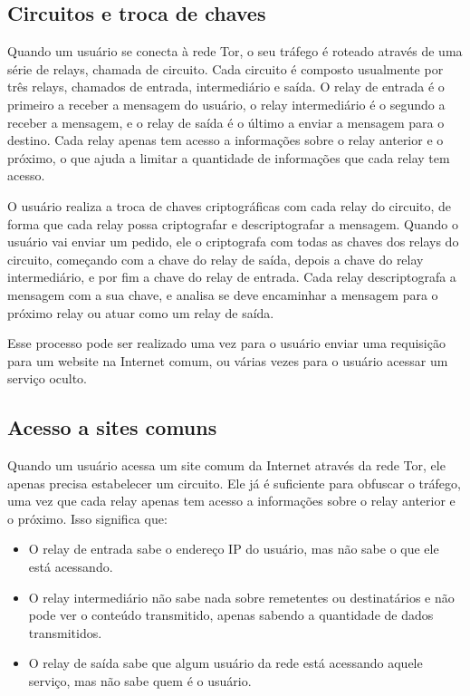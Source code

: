 \subsection{Circuitos e troca de chaves}

Quando um usuário se conecta à rede Tor, o seu tráfego é roteado através de uma série de relays, chamada de circuito. Cada circuito é composto usualmente por três relays, chamados de entrada, intermediário e saída. O relay de entrada é o primeiro a receber a mensagem do usuário, o relay intermediário é o segundo a receber a mensagem, e o relay de saída é o último a enviar a mensagem para o destino. Cada relay apenas tem acesso a informações sobre o relay anterior e o próximo, o que ajuda a limitar a quantidade de informações que cada relay tem acesso.

O usuário realiza a troca de chaves criptográficas com cada relay do circuito, de forma que cada relay possa criptografar e descriptografar a mensagem. Quando o usuário vai enviar um pedido, ele o criptografa com todas as chaves dos relays do circuito, começando com a chave do relay de saída, depois a chave do relay intermediário, e por fim a chave do relay de entrada. Cada relay descriptografa a mensagem com a sua chave, e analisa se deve encaminhar a mensagem para o próximo relay ou atuar como um relay de saída.

Esse processo pode ser realizado uma vez para o usuário enviar uma requisição para um website na Internet comum, ou várias vezes para o usuário acessar um serviço oculto.

\subsection{Acesso a sites comuns}

Quando um usuário acessa um site comum da Internet através da rede Tor, ele apenas precisa estabelecer um circuito. Ele já é suficiente para obfuscar o tráfego, uma vez que cada relay apenas tem acesso a informações sobre o relay anterior e o próximo. Isso significa que:

\begin{itemize}
    \item O relay de entrada sabe o endereço IP do usuário, mas não sabe o que ele está acessando.
    \item O relay intermediário não sabe nada sobre remetentes ou destinatários e não pode ver o conteúdo transmitido, apenas sabendo a quantidade de dados transmitidos.
    \item O relay de saída sabe que algum usuário da rede está acessando aquele serviço, mas não sabe quem é o usuário.
\end{itemize}

